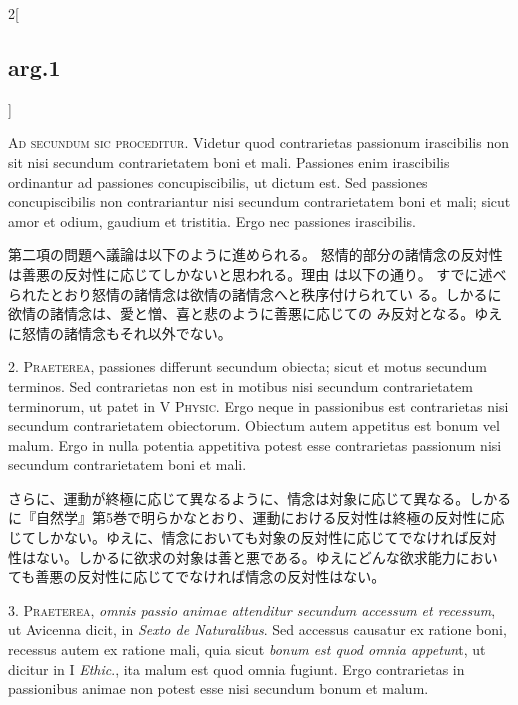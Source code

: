 \documentclass[paper=a4paper,fontsize=10pt,jafontsize=9pt,titlepage]{jlreq}
\begin{document}
\begin{paracol}{2}[\subsection{arg.1}]

{\scshape Ad secundum sic proceditur}. Videtur quod contrarietas passionum
irascibilis non sit nisi secundum contrarietatem boni et mali. Passiones
enim irascibilis ordinantur ad passiones concupiscibilis, ut dictum
est. Sed passiones concupiscibilis non contrariantur nisi secundum
contrarietatem boni et mali; sicut amor et odium, gaudium et
tristitia. Ergo nec passiones irascibilis.

\switchcolumn

第二項の問題へ議論は以下のように進められる。
怒情的部分の諸情念の反対性は善悪の反対性に応じてしかないと思われる。理由
 は以下の通り。
すでに述べられたとおり怒情の諸情念は欲情の諸情念へと秩序付けられてい
 る。しかるに欲情の諸情念は、愛と憎、喜と悲のように善悪に応じての
 み反対となる。ゆえに怒情の諸情念もそれ以外でない。

\switchcolumn*[\subsection{s.c.}]

2. {\scshape Praeterea}, passiones differunt secundum obiecta; sicut et motus secundum
terminos. Sed contrarietas non est in motibus nisi secundum
contrarietatem terminorum, ut patet in V {\scshape Physic}. Ergo neque in
passionibus est contrarietas nisi secundum contrarietatem
obiectorum. Obiectum autem appetitus est bonum vel malum. Ergo in nulla
potentia appetitiva potest esse contrarietas passionum nisi secundum
contrarietatem boni et mali.

\switchcolumn

さらに、運動が終極に応じて異なるように、情念は対象に応じて異なる。しかる
 に『自然学』第5巻で明らかなとおり、運動における反対性は終極の反対性に応
 じてしかない。ゆえに、情念においても対象の反対性に応じてでなければ反対
 性はない。しかるに欲求の対象は善と悪である。ゆえにどんな欲求能力におい
 ても善悪の反対性に応じてでなければ情念の反対性はない。


3. {\scshape Praeterea}, {\itshape omnis passio animae attenditur secundum accessum et recessum},
ut Avicenna dicit, in {\itshape Sexto de Naturalibus}. Sed accessus causatur ex
ratione boni, recessus autem ex ratione mali, quia sicut {\itshape bonum est quod
omnia appetun}t, ut dicitur in I {\itshape Ethic}., ita malum est quod omnia
fugiunt. Ergo contrarietas in passionibus animae non potest esse nisi
secundum bonum et malum.


\end{paracol}
\end{document}
